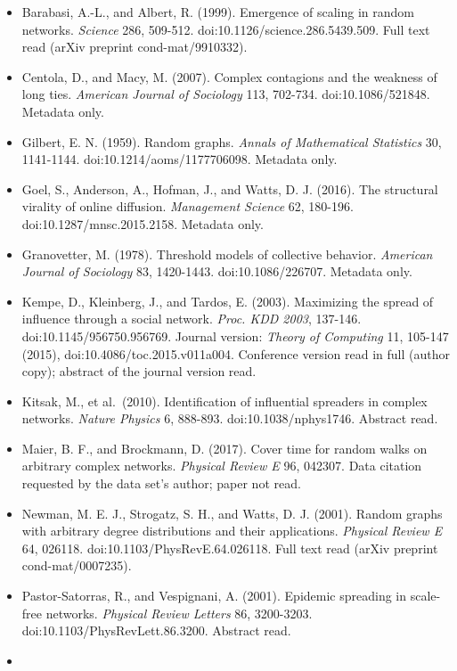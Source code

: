 \documentclass[
]{article}
\providecommand{\tightlist}{%
  \setlength{\itemsep}{0pt}\setlength{\parskip}{0pt}}
\begin{document}
\begin{itemize}
\tightlist
\item
  Barabasi, A.-L., and Albert, R. (1999). Emergence of scaling in random
  networks. \emph{Science} 286, 509-512.
  doi:10.1126/science.286.5439.509. Full text read (arXiv preprint
  cond-mat/9910332).
\item
  Centola, D., and Macy, M. (2007). Complex contagions and the weakness
  of long ties. \emph{American Journal of Sociology} 113, 702-734.
  doi:10.1086/521848. Metadata only.
\item
  Gilbert, E. N. (1959). Random graphs. \emph{Annals of Mathematical
  Statistics} 30, 1141-1144. doi:10.1214/aoms/1177706098. Metadata only.
\item
  Goel, S., Anderson, A., Hofman, J., and Watts, D. J. (2016). The
  structural virality of online diffusion. \emph{Management Science} 62,
  180-196. doi:10.1287/mnsc.2015.2158. Metadata only.
\item
  Granovetter, M. (1978). Threshold models of collective behavior.
  \emph{American Journal of Sociology} 83, 1420-1443.
  doi:10.1086/226707. Metadata only.
\item
  Kempe, D., Kleinberg, J., and Tardos, E. (2003). Maximizing the spread
  of influence through a social network. \emph{Proc. KDD 2003}, 137-146.
  doi:10.1145/956750.956769. Journal version: \emph{Theory of Computing}
  11, 105-147 (2015), doi:10.4086/toc.2015.v011a004. Conference version
  read in full (author copy); abstract of the journal version read.
\item
  Kitsak, M., et al.~(2010). Identification of influential spreaders in
  complex networks. \emph{Nature Physics} 6, 888-893.
  doi:10.1038/nphys1746. Abstract read.
\item
  Maier, B. F., and Brockmann, D. (2017). Cover time for random walks on
  arbitrary complex networks. \emph{Physical Review E} 96, 042307. Data
  citation requested by the data set's author; paper not read.
\item
  Newman, M. E. J., Strogatz, S. H., and Watts, D. J. (2001). Random
  graphs with arbitrary degree distributions and their applications.
  \emph{Physical Review E} 64, 026118. doi:10.1103/PhysRevE.64.026118.
  Full text read (arXiv preprint cond-mat/0007235).
\item
  Pastor-Satorras, R., and Vespignani, A. (2001). Epidemic spreading in
  scale-free networks. \emph{Physical Review Letters} 86, 3200-3203.
  doi:10.1103/PhysRevLett.86.3200. Abstract read.
\item

\end{itemize}
\end{document}
